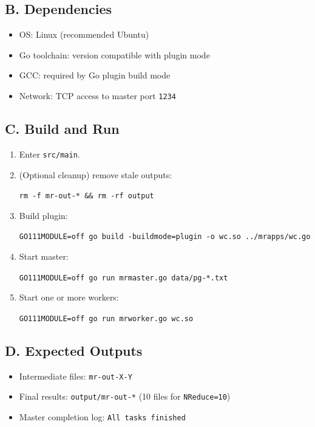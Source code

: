 \documentclass[12pt]{article}
\begin{document}
\subsection*{B. Dependencies}
\begin{itemize}[leftmargin=1.5em]
  \item OS: Linux (recommended Ubuntu)
  \item Go toolchain: version compatible with plugin mode
  \item GCC: required by Go plugin build mode
  \item Network: TCP access to master port \texttt{1234}
\end{itemize}

\subsection*{C. Build and Run}
\begin{enumerate}[leftmargin=1.5em]
  \item Enter \texttt{src/main}.
  \item (Optional cleanup) remove stale outputs:
\begin{center}
\texttt{rm -f mr-out-* \&\& rm -rf output}
\end{center}
  \item Build plugin:
\begin{center}
\texttt{GO111MODULE=off go build -buildmode=plugin -o wc.so ../mrapps/wc.go}
\end{center}
  \item Start master:
\begin{center}
\texttt{GO111MODULE=off go run mrmaster.go data/pg-*.txt}
\end{center}
  \item Start one or more workers:
\begin{center}
\texttt{GO111MODULE=off go run mrworker.go wc.so}
\end{center}
\end{enumerate}

\subsection*{D. Expected Outputs}
\begin{itemize}[leftmargin=1.5em]
  \item Intermediate files: \texttt{mr-out-X-Y}
  \item Final results: \texttt{output/mr-out-*} (10 files for \texttt{NReduce=10})
  \item Master completion log: \texttt{All tasks finished}
\end{itemize}
\end{document}
